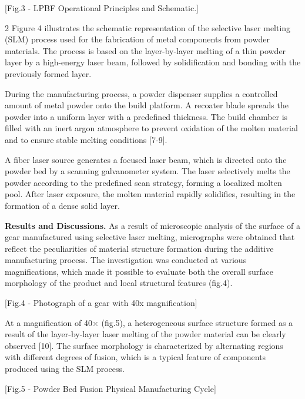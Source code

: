 [Fig.3 - LPBF Operational Principles and Schematic.]

\begin{multicols}{2}
Figure 4 illustrates the schematic representation of the selective laser
melting (SLM) process used for the fabrication of metal components from
powder materials. The process is based on the layer-by-layer melting of
a thin powder layer by a high-energy laser beam, followed by
solidification and bonding with the previously formed layer.

During the manufacturing process, a powder dispenser supplies a
controlled amount of metal powder onto the build platform. A recoater
blade spreads the powder into a uniform layer with a predefined
thickness. The build chamber is filled with an inert argon atmosphere to
prevent oxidation of the molten material and to ensure stable melting
conditions {[}7-9{]}.

A fiber laser source generates a focused laser beam, which is directed
onto the powder bed by a scanning galvanometer system. The laser
selectively melts the powder according to the predefined scan strategy,
forming a localized molten pool. After laser exposure, the molten
material rapidly solidifies, resulting in the formation of a dense solid
layer.

{\bfseries Results and Discussions.} As a result of microscopic analysis of
the surface of a gear manufactured using selective laser melting,
micrographs were obtained that reflect the peculiarities of material
structure formation during the additive manufacturing process. The
investigation was conducted at various magnifications, which made it
possible to evaluate both the overall surface morphology of the product
and local structural features (fig.4).

[Fig.4 - Photograph of a gear with 40x magnification]

At a magnification of 40× (fig.5), a heterogeneous surface structure
formed as a result of the layer-by-layer laser melting of the powder
material can be clearly observed {[}10{]}. The surface morphology is
characterized by alternating regions with different degrees of fusion,
which is a typical feature of components produced using the SLM process.
\end{multicols}

[Fig.5 - Powder Bed Fusion Physical Manufacturing Cycle]

